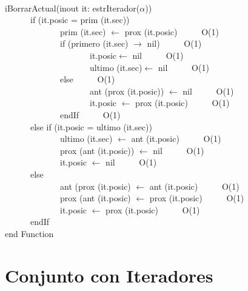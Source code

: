 \documentclass[a4paper,10pt]{article}
\begin{document}
\newpage

\begin{algoritmo}
\caption{}\\
  iBorrarActual(inout it: estrIterador($\alpha$))\\
	\indent \ \ \ \ \ \ if (it.posic = prim (it.sec))\ \ \ \ \ \\  
	\indent \ \ \ \ \ \ \ \ \ \ \ \ \  prim (it.sec) $\gets$ prox (it.posic) \ \ \ \ \ O(1)\\  
	\indent \ \ \ \ \ \ \ \ \ \ \ \ \  if (primero (it.sec) $\rightarrow$ nil) \ \ \ \ \ O(1)\\  
	\indent \ \ \ \ \ \ \ \ \ \ \ \ \ \ \ \ \ \ \ \  it.posic$\gets$ nil \ \ \ \ \ O(1)\\  
	\indent \ \ \ \ \ \ \ \ \ \ \ \ \ \ \ \ \ \ \ \  ultimo (it.sec)$\gets$ nil \ \ \ \ \ O(1)\\  
	\indent \ \ \ \ \ \ \ \ \ \ \ \ \  else \ \ \ \ \ O(1)\\  
	\indent \ \ \ \ \ \ \ \ \ \ \ \ \ \ \ \ \ \ \ \ ant (prox (it.posic)) $\gets$ nil \ \ \ \ \ O(1)\\  
	\indent \ \ \ \ \ \ \ \ \ \ \ \ \ \ \ \ \ \ \ \ it.posic $\gets$ prox (it.posic) \ \ \ \ \ O(1)\\ 
	\indent \ \ \ \ \ \ \ \ \ \ \ \ \  endIf \ \ \ \ \ O(1)\\  
	\indent \ \ \ \ \ \ else if (it.posic = ultimo (it.sec))\ \ \ \ \ \\  
	\indent \ \ \ \ \ \ \ \ \ \ \ \ \  ultimo (it.sec) $\gets$ ant (it.posic) \ \ \ \ \ O(1)\\  
	\indent \ \ \ \ \ \ \ \ \ \ \ \ \  prox (ant (it.posic)) $\gets$ nil \ \ \ \ \ O(1)\\  
	\indent \ \ \ \ \ \ \ \ \ \ \ \ \  it.posic $\gets$ nil \ \ \ \ \ O(1)\\ 
	\indent \ \ \ \ \ \ else \ \ \ \ \ \\  	
	\indent \ \ \ \ \ \ \ \ \ \ \ \ \  ant (prox (it.posic) $\gets$ ant (it.posic) \ \ \ \ \ O(1)\\  
	\indent \ \ \ \ \ \ \ \ \ \ \ \ \  prox (ant (it.posic) $\gets$ prox (it.posic) \ \ \ \ \ O(1)\\  
	\indent \ \ \ \ \ \ \ \ \ \ \ \ \  it.posic $\gets$ prox (it.posic) \ \ \ \ \ O(1)\\
	\indent \ \ \ \ \ \ endIf \ \ \ \ \ \\  	
end Function 
\end{algoritmo}

\newpage

\section{Conjunto con Iteradores}
\end{document}

